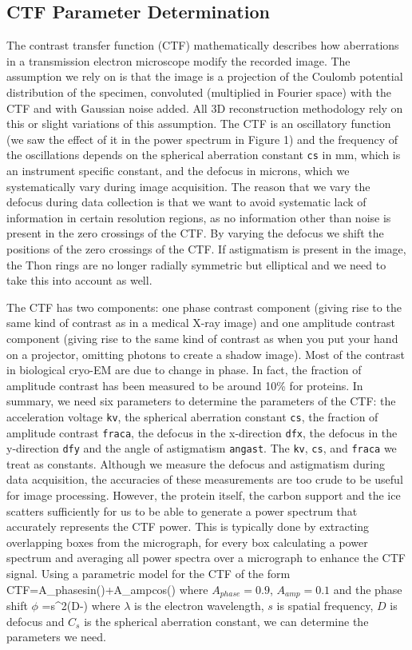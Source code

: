 \documentclass[a4paper,11pt]{article}
\begin{document}
\subsection{CTF Parameter Determination}
The contrast transfer function (CTF) mathematically describes how aberrations in a transmission electron microscope modify the recorded image. The assumption we rely on is that the image is a projection of the Coulomb potential distribution of the specimen, convoluted (multiplied in Fourier space) with the CTF and with Gaussian noise added. All 3D reconstruction methodology rely on this or slight variations of this assumption. The CTF is an oscillatory function (we saw the effect of it in the power spectrum in Figure 1) and the frequency of the oscillations depends on the spherical aberration constant \texttt{cs} in mm, which is an instrument specific constant, and  the defocus in microns, which we systematically vary during image acquisition. The reason that we vary the defocus during data collection is that we want to avoid systematic lack of information in certain resolution regions, as no information other than noise is present in the zero crossings of the CTF. By varying the defocus we shift the positions of the zero crossings of the CTF. If astigmatism is present in the image, the Thon rings are no longer radially symmetric but elliptical and we need to take this into account as well.

The CTF has two components: one phase contrast component (giving rise to the same kind of contrast as in a medical X-ray image)  and one amplitude contrast component (giving rise to the same kind of contrast as when you put your hand on a projector, omitting photons to create a shadow image). Most of the contrast in biological cryo-EM are due to change in phase. In fact, the fraction of amplitude contrast has been measured to be around 10\% for proteins. In summary, we need six parameters to determine the parameters of the CTF: the acceleration voltage \texttt{kv}, the spherical aberration constant \texttt{cs}, the fraction of amplitude contrast \texttt{fraca}, the defocus in the x-direction \texttt{dfx}, the defocus in the y-direction \texttt{dfy} and the angle of astigmatism \texttt{angast}. The \texttt{kv}, \texttt{cs}, and \texttt{fraca} we treat as constants. Although we measure the defocus and astigmatism during data acquisition, the accuracies of these measurements are too crude to be useful for image processing. However, the protein itself, the carbon support and the ice scatters sufficiently for us to be able to generate a power spectrum that accurately represents the CTF power. This is typically done by extracting overlapping boxes from the micrograph, for every box calculating a power spectrum and averaging all power spectra over a micrograph to enhance the CTF signal. Using a parametric model for the CTF of the form
\bea
CTF=A_{phase}sin(\phi)+A_{amp}cos(\phi)
\eea
where $A_{phase}=0.9$, $A_{amp}=0.1$ and the phase shift $\phi$
\bea
\phi=\pi{}\lambda{}s^{2}(D-)
\eea
where $\lambda{}$ is the electron wavelength, $s$ is spatial frequency, $D$ is defocus and $C_{s}$ is the spherical aberration constant, we can determine  the parameters we need.
\end{document}
